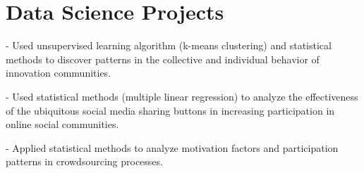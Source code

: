 
\section{Data Science Projects}

-  Used unsupervised learning algorithm (k-means clustering) and statistical methods to discover patterns in the collective and individual behavior of innovation communities.

-  Used statistical methods (multiple linear regression) to analyze the effectiveness of the ubiquitous social media sharing buttons in increasing participation in online social communities.

-  Applied statistical methods to analyze motivation factors and participation patterns in crowdsourcing processes.
